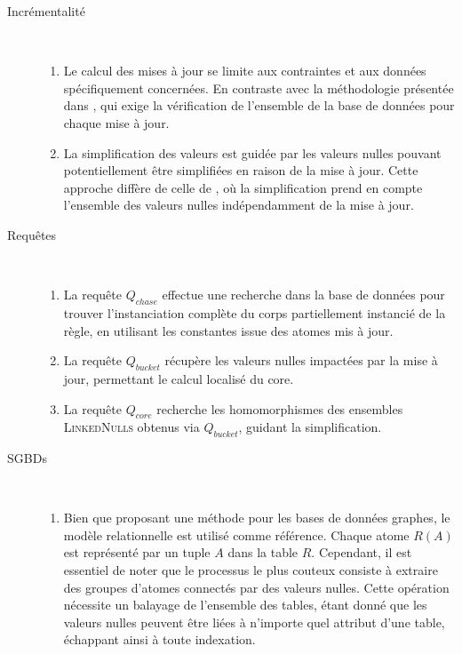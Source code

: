 \begin{description}
    \item[Incrémentalité] ~
    \begin{enumerate}
        \item Le calcul des mises à jour se limite aux contraintes et aux données spécifiquement concernées.
        En contraste avec la méthodologie présentée dans \cite{chabinConsistentUpdatingDatabases2020}, qui exige la vérification de l'ensemble de la base de données pour chaque mise à jour.

        \item La simplification des valeurs est guidée par les valeurs nulles pouvant potentiellement être simplifiées en raison de la mise à jour.
        Cette approche diffère de celle de \cite{chabinConsistentUpdatingDatabases2020}, où la simplification prend en compte l'ensemble des valeurs nulles indépendamment de la mise à jour.
    \end{enumerate}

    \item[Requêtes] ~
    \begin{enumerate}
        \item La requête $Q_{chase}$ effectue une recherche dans la base de données pour trouver l'instanciation complète du corps partiellement instancié de la règle, en utilisant les constantes issue des atomes mis à jour.

        \item La requête $Q_{bucket}$ récupère les valeurs nulles impactées par la mise à jour, permettant le calcul localisé du \gls{core}.

        \item La requête $Q_{core}$ recherche les homomorphismes des ensembles \textsc{LinkedNulls} obtenus via $Q_{bucket}$, guidant la simplification.
    \end{enumerate}

    \item[SGBDs] ~
    \begin{enumerate}
        \item Bien que proposant une méthode pour les bases de données graphes, le modèle relationnelle est utilisé comme référence.
        Chaque atome $R(A)$ est représenté par un tuple $A$ dans la table $R$.
        Cependant, il est essentiel de noter que le processus le plus couteux consiste à extraire des groupes d'atomes connectés par des valeurs nulles.
        Cette opération nécessite un balayage de l'ensemble des tables, étant donné que les valeurs nulles peuvent être liées à n'importe quel attribut d'une table, échappant ainsi à toute indexation.


\end{enumerate}
\end{description}
